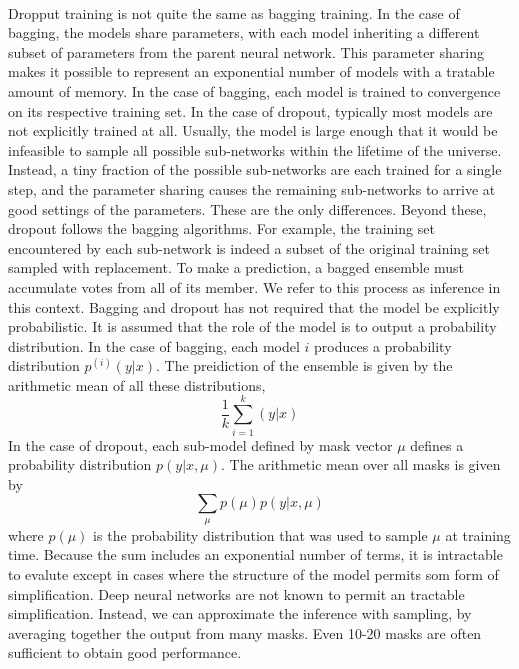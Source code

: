\paragraph{}
Dropput training is not quite the same as bagging training.
In the case of bagging, the models share parameters, with each model inheriting a different subset of parameters from the parent neural network.
This parameter sharing makes it possible to represent an exponential number of models with a tratable amount of memory.
In the case of bagging, each model is trained to convergence on its respective training set.
In the case of dropout, typically most models are not explicitly trained at all.
Usually, the model is large enough that it would be infeasible to sample all possible sub-networks within the lifetime of the universe.
Instead, a tiny fraction of the possible sub-networks are each trained for a single step, and the parameter sharing causes the remaining sub-networks to arrive at good settings of the parameters.
These are the only differences.
Beyond these, dropout follows the bagging algorithms.
For example, the training set encountered by each sub-network is indeed a subset of the original training set sampled with replacement.
To make a prediction, a bagged ensemble must accumulate votes from all of its member.
We refer to this process as inference in this context.
Bagging and dropout has not required that the model be explicitly probabilistic.
It is assumed that the role of the model is to output a probability distribution.
In the case of bagging, each model $i$ produces a probability distribution $p^{(i)}(y|x)$.
The preidiction of the ensemble is given by the arithmetic mean of all these distributions,
\begin{equation}
    \frac{1}{k} \sum_{i=1}^k (y|x)
\end{equation}
In the case of dropout, each sub-model defined by mask vector $\mu$ defines a probability distribution $p(y|x, \mu)$.
The arithmetic mean over all masks is given by
\begin{equation}
    \sum_\mu p(\mu) p(y|x, \mu)
\end{equation}
where $p(\mu)$ is the probability distribution that was used to sample $\mu$ at training time.
Because the sum includes an exponential number of terms, it is intractable to evalute except in cases where the structure of the model permits som form of simplification.
Deep neural networks are not known to permit an tractable simplification.
Instead, we can approximate the inference with sampling, by averaging together the output from many masks.
Even 10-20 masks are often sufficient to obtain good performance.
